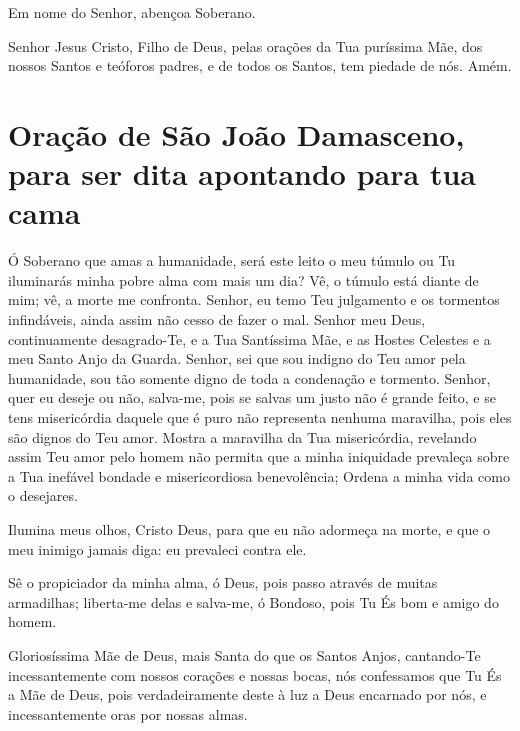 \documentclass{subfiles}
\begin{document}
\Doxology{}

\mercy{} \thrice{}

Em nome do Senhor, abençoa Soberano.

Senhor Jesus Cristo, Filho de Deus, pelas orações da Tua puríssima Mãe, dos
nossos Santos e teóforos padres, e de todos os Santos, tem piedade de nós. Amém.


\section*{Oração de São João Damasceno, para ser dita apontando para tua cama}

Ó Soberano que amas a humanidade, será este leito o meu túmulo ou
Tu iluminarás minha pobre alma com mais um dia? Vê, o túmulo está diante
de mim; vê, a morte me confronta. Senhor, eu temo Teu julgamento e os
tormentos infindáveis, ainda assim não cesso de fazer o mal. Senhor meu Deus,
continuamente desagrado-Te, e a Tua Santíssima Mãe, e as Hostes Celestes e
a meu Santo Anjo da Guarda. Senhor, sei que sou indigno do Teu amor pela
humanidade, sou tão somente digno de toda a condenação e tormento.
Senhor, quer eu deseje ou não, salva-me, pois se salvas um justo não é grande
feito, e se tens misericórdia daquele que é puro não representa nenhuma
maravilha, pois eles são dignos do Teu amor. Mostra a maravilha da Tua
misericórdia, revelando assim Teu amor pelo homem não permita que a minha
iniquidade prevaleça sobre a Tua inefável bondade e misericordiosa
benevolência; Ordena a minha vida como o desejares.


Ilumina meus olhos, Cristo Deus, para que eu não adormeça na morte,
e que o meu inimigo jamais diga: eu prevaleci contra ele.

\doxology{}

Sê o propiciador da minha alma, ó Deus, pois passo através de muitas armadilhas;
liberta-me delas e salva-me, ó Bondoso, pois Tu És bom e amigo do homem.

\nowandever{}

Gloriosíssima Mãe de Deus, mais Santa do que os Santos Anjos, cantando-Te
incessantemente com nossos corações e nossas bocas, nós confessamos que Tu És a
Mãe de Deus, pois verdadeiramente deste à luz a Deus encarnado por nós, e
incessantemente oras por nossas almas.

\end{document}
